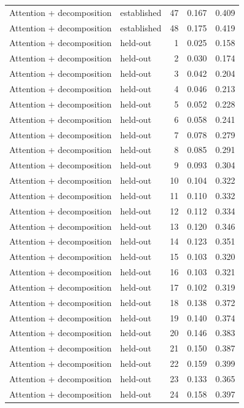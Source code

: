 \begin{tabular}{llrrr}
Attention + decomposition & established & 47 & 0.167 & 0.409 \\
Attention + decomposition & established & 48 & 0.175 & 0.419 \\
Attention + decomposition & held-out & 1 & 0.025 & 0.158 \\
Attention + decomposition & held-out & 2 & 0.030 & 0.174 \\
Attention + decomposition & held-out & 3 & 0.042 & 0.204 \\
Attention + decomposition & held-out & 4 & 0.046 & 0.213 \\
Attention + decomposition & held-out & 5 & 0.052 & 0.228 \\
Attention + decomposition & held-out & 6 & 0.058 & 0.241 \\
Attention + decomposition & held-out & 7 & 0.078 & 0.279 \\
Attention + decomposition & held-out & 8 & 0.085 & 0.291 \\
Attention + decomposition & held-out & 9 & 0.093 & 0.304 \\
Attention + decomposition & held-out & 10 & 0.104 & 0.322 \\
Attention + decomposition & held-out & 11 & 0.110 & 0.332 \\
Attention + decomposition & held-out & 12 & 0.112 & 0.334 \\
Attention + decomposition & held-out & 13 & 0.120 & 0.346 \\
Attention + decomposition & held-out & 14 & 0.123 & 0.351 \\
Attention + decomposition & held-out & 15 & 0.103 & 0.320 \\
Attention + decomposition & held-out & 16 & 0.103 & 0.321 \\
Attention + decomposition & held-out & 17 & 0.102 & 0.319 \\
Attention + decomposition & held-out & 18 & 0.138 & 0.372 \\
Attention + decomposition & held-out & 19 & 0.140 & 0.374 \\
Attention + decomposition & held-out & 20 & 0.146 & 0.383 \\
Attention + decomposition & held-out & 21 & 0.150 & 0.387 \\
Attention + decomposition & held-out & 22 & 0.159 & 0.399 \\
Attention + decomposition & held-out & 23 & 0.133 & 0.365 \\
Attention + decomposition & held-out & 24 & 0.158 & 0.397 \\

\end{tabular}
